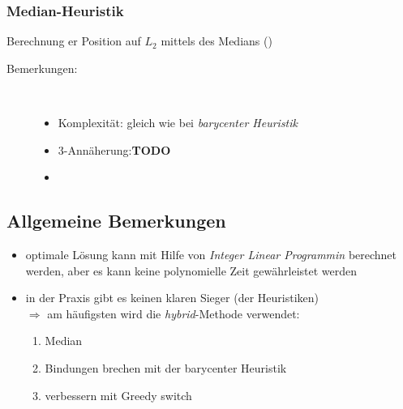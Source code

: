 \subsubsection{Median-Heuristik}
Berechnung er Position auf $L_2$ mittels des Medians ()
\begin{description}
	\item[Bemerkungen:]\ \\ \vspace*{-\baselineskip}
		\begin{itemize}
			\item Komplexität: gleich wie bei \textit{barycenter Heuristik}
			\item 3-Annäherung:{\color{red}\textbf{TODO}}%
			\item {}
		\end{itemize}
\end{description}
\subsection{Allgemeine Bemerkungen}
\begin{itemize}[itemsep=-1pt]
	\item optimale Lösung kann mit Hilfe von \textit{Integer Linear Programmin} berechnet werden, aber es kann keine polynomielle Zeit gewährleistet werden
	\item in der Praxis gibt es keinen klaren Sieger (der Heuristiken)\\
		$\Rightarrow$ am häufigsten wird die \textit{hybrid}-Methode verwendet:
			\begin{enumerate}
				\item Median
				\item Bindungen brechen mit der barycenter Heuristik
				\item verbessern mit Greedy switch
			\end{enumerate}
\end{itemize}